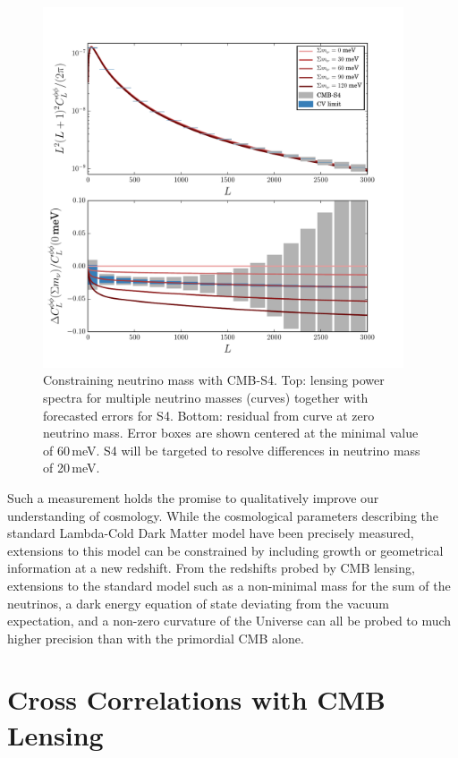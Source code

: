 \begin{figure}[h]
\centering
\includegraphics[width=0.95\textwidth]{CMBLensing/s4errors.pdf}
\caption{Constraining neutrino mass with CMB-S4.  Top: lensing power spectra for multiple neutrino masses (curves) together with forecasted errors for S4.  Bottom: residual from curve at zero neutrino mass.  Error boxes are shown centered at the minimal value of $60$\,meV.  S4 will be targeted to resolve differences in neutrino mass of 20\,meV. }
\label{Neutrinos}
\end{figure}

 
Such a measurement holds the promise to qualitatively improve our understanding of cosmology.  While the cosmological parameters describing the standard 
Lambda-Cold Dark Matter model have been precisely measured, extensions to this model can be constrained by including growth or geometrical information at a new redshift.  From the redshifts probed by CMB lensing, extensions to the standard model such as a non-minimal mass for the sum of the neutrinos, a dark energy equation of state deviating from the vacuum expectation, and a non-zero curvature of the Universe can all be probed to much higher precision than with the primordial CMB alone. 



\section{Cross Correlations with CMB Lensing}\label{cross}

